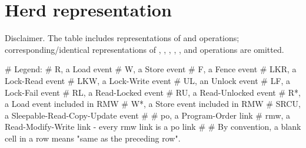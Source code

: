 \section{Herd representation}
\label{sec:lkmm:Herd representation}

\begin{Note}
  Disclaimer.
  The table includes representations of  and  operations;
  corresponding/identical representations of , , ,
  , , and  operations are omitted.
\end{Note}

\begin{VerbatimU}[tabsize=8]
# Legend:
#	R,	a Load event
#	W,	a Store event
#	F,	a Fence event
#	LKR,	a Lock-Read event
#	LKW,	a Lock-Write event
#	UL,	an Unlock event
#	LF,	a Lock-Fail event
#	RL,	a Read-Locked event
#	RU,	a Read-Unlocked event
#	R*,	a Load event included in RMW
#	W*,	a Store event included in RMW
#	SRCU,	a Sleepable-Read-Copy-Update event
#
#	po,	a Program-Order link
#	rmw,	a Read-Modify-Write link - every rmw link is a po link
#
# By convention, a blank cell in a row means "same as the preceding row".
\end{VerbatimU}

\newcommand{\Dark}{\rowcolor{lightgray}}
\newcommand{\Extraspace}{\addlinespace[2pt]}


